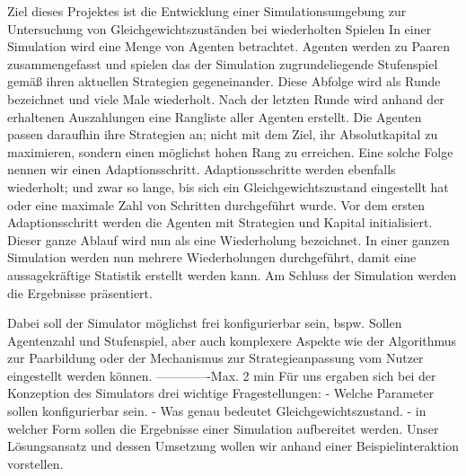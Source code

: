 \documentclass[parskip=full,11pt]{scrartcl}
\begin{document}
Ziel dieses Projektes ist die Entwicklung einer Simulationsumgebung zur Untersuchung von Gleichgewichtszuständen bei wiederholten Spielen
In einer Simulation wird eine Menge von Agenten betrachtet.
Agenten werden zu Paaren zusammengefasst und spielen das der Simulation zugrundeliegende Stufenspiel gemäß ihren aktuellen Strategien gegeneinander. Diese Abfolge wird als Runde bezeichnet und viele Male wiederholt. Nach der letzten Runde wird anhand der erhaltenen Auszahlungen eine Rangliste aller Agenten erstellt. Die Agenten passen daraufhin ihre Strategien an; nicht mit dem Ziel, ihr Absolutkapital zu maximieren, sondern einen möglichst hohen Rang zu erreichen. Eine solche Folge nennen wir einen Adaptionsschritt.
Adaptionsschritte werden ebenfalls wiederholt; und zwar so lange, bis sich ein Gleichgewichtszustand eingestellt hat oder eine maximale Zahl von Schritten durchgeführt wurde. Vor dem ersten Adaptionsschritt werden die Agenten mit Strategien und Kapital initialisiert. Dieser ganze Ablauf wird nun als eine Wiederholung bezeichnet.
In einer ganzen Simulation werden nun mehrere Wiederholungen durchgeführt, damit eine aussagekräftige Statistik erstellt werden kann. Am Schluss der Simulation werden die Ergebnisse präsentiert.

Dabei soll der Simulator möglichst frei konfigurierbar sein, bspw. Sollen Agentenzahl und Stufenspiel, aber auch komplexere Aspekte wie der Algorithmus zur Paarbildung oder der Mechanismus zur Strategieanpassung vom Nutzer eingestellt werden können.
-------------Max. 2 min
Für uns ergaben sich bei der Konzeption des Simulators drei wichtige Fragestellungen: 
 - Welche Parameter sollen konfigurierbar sein.
 - Was genau bedeutet Gleichgewichtszustand.
 - in welcher Form sollen die Ergebnisse einer Simulation aufbereitet werden.
Unser Lösungsansatz und dessen Umsetzung wollen wir anhand einer Beispielinteraktion vorstellen.
\end{document}
